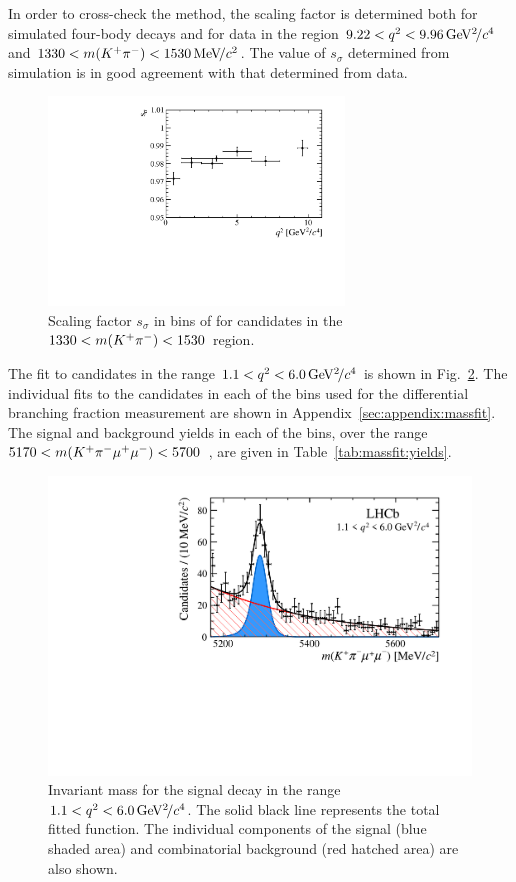 In order to cross-check the method, the scaling factor is determined both for simulated four-body \BdToKpimm decays and for data in the region $9.22<{q^2}<9.96{\mathrm{\,Ge\kern -0.1em V^2\!/}c^4}$ and $1330<m({{K}^+}{{\pi}^-})<1530{\mathrm{\,Me\kern -0.1em V\!/}c^2}$.  The value of $s_{\sigma}$ determined from simulation is in good agreement with that determined from data.

\begin{figure}[!tb]
 \centering
 \includegraphics[width=0.7\textwidth]{figs/kpimm/massfit/s_sigma.pdf}
 \caption{Scaling factor $s_{\sigma}$ in bins of \qsq for candidates in the $1330<m({{K}^+}{{\pi}^-})<1530$~\mevcc region.
 \label{fig:massfit:scale}}
\end{figure}

 The fit to \BdToKpimm candidates in the range $1.1 < {q^2} < 6.0{\mathrm{\,Ge\kern -0.1em V^2\!/}c^4}$ is shown in Fig.~\ref{fig:massfit:kpimm}.  The individual fits to the \BdToKpimm candidates in each of the \qsq bins used for the differential branching fraction measurement are shown in Appendix~\ref{sec:appendix:massfit}. The signal and background yields in each of the \qsq bins, over the range $5170<m({{K}^+}{{\pi}^-}{\mu^+}{\mu^-})<5700$~\mevcc, are given in Table~\ref{tab:massfit:yields}.

\begin{figure}[!tb]
\centering
\includegraphics[width=0.7\linewidth]{figs/kpimm/massfit/fitKpimumu_q2_1p1_6p0.pdf}
\caption{Invariant mass \mkpimm for the signal decay \BdToKpimm in the range $1.1 < {q^2} < 6.0{\mathrm{\,Ge\kern -0.1em V^2\!/}c^4}$. The solid black line represents the total fitted function. The individual components of the signal (blue shaded area) and combinatorial background (red hatched area) are also shown.}
\label{fig:massfit:kpimm}
\end{figure}

